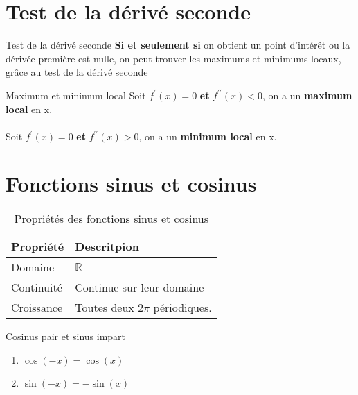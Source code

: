 \documentclass{report}
\begin{document}
\begin{multicols*}{3}
\section{Test de la dérivé seconde}
\begin{Concept}{Test de la dérivé seconde}{}
\textbf{Si et seulement si} on obtient un point d'intérêt ou la dérivée première est nulle, on peut trouver 
les maximums et minimums locaux, grâce au test de la dérivé seconde    
\end{Concept}

\begin{Definitionx*}{Maximum et minimum local}{}
  Soit $f^{\prime}\left(x\right) = 0$ \textcolor{myb}{\textbf{et}} $f^{\prime\prime}\left(x\right) < 0$, on a  
  un \textbf{maximum local} en x. \\\\
    Soit $f^{\prime}\left(x\right) = 0$ \textcolor{myb}{\textbf{et}} $f^{\prime\prime}\left(x\right) > 0$, on a  
  un \textbf{minimum local} en x.
\end{Definitionx*}

\section{Fonctions sinus et cosinus}
\begin{table}[H]
  \caption {Propriétés des fonctions sinus et cosinus}

  \begin{center}
    \renewcommand{\arraystretch}{1.5}
    \selectfont
    \footnotesize
    \begin{tabular}{l|l}
    \arrayrulecolor{blue}\hline
    \rowcolor{lightBlue}
    \textcolor{myb}{Propriété} & \textcolor{myb}{Descritpion}
    \\
    \hline
    \arrayrulecolor{black}
Domaine
& 
$\mathbb{R}$
\\
\hline
Continuité
&
Continue sur leur domaine  
\\
\hline
Croissance 
&
Toutes deux $2\pi$ périodiques. 
\\
\hline
\end{tabular}
\end{center}
\end{table}

\begin{Identite}{Cosinus pair et sinus impart}{}
    \begin{enumerate}
        \item   $\cos\left(-x\right) = \cos\left(x\right)$ 
        \item $\sin\left(-x\right) = -\sin\left(x\right)$
    \end{enumerate}
\end{Identite}


\end{multicols*}
\end{document}

